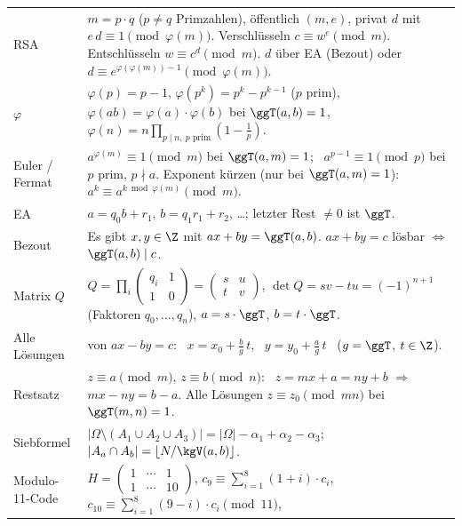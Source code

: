 \noindent\begin{tabular}{@{}>{\raggedright\arraybackslash}p{3.2cm}>{\raggedright\arraybackslash}p{\dimexpr\linewidth-3.2cm-2\tabcolsep\relax}@{}}
\toprule
RSA & $m = p \cdot q$ ($p \ne q$ Primzahlen), öffentlich $(m, e)$, privat $d$ mit $e\,d \equiv 1 \pmod{\varphi(m)}$.
Verschlüsseln $c \equiv w^e \pmod m$. Entschlüsseln $w \equiv c^d \pmod m$.
$d$ über EA (Bezout) oder $d \equiv e^{\varphi(\varphi(m)) - 1} \pmod{\varphi(m)}$.\\
$\varphi$ & $\varphi(p) = p - 1$, $\varphi(p^k) = p^k - p^{k-1}$ ($p$ prim), $\varphi(ab) = \varphi(a) \cdot \varphi(b)$ bei $\ggT(a,b) = 1$,
$\varphi(n) = n \prod_{p \mid n,\ p \text{ prim}} (1 - \frac1p)$.\\
Euler / Fermat & $a^{\varphi(m)} \equiv 1 \pmod m$ bei $\ggT(a, m) = 1$; \ $a^{p-1} \equiv 1 \pmod p$ bei $p$ prim, $p \nmid a$.
Exponent kürzen (nur bei $\ggT(a, m) = 1$): $a^k \equiv a^{k \bmod \varphi(m)} \pmod m$.\\
EA & $a = q_0 b + r_1$, $b = q_1 r_1 + r_2$, \dots; letzter Rest $\neq 0$ ist $\ggT$.\\
Bezout & Es gibt $x, y \in \Z$ mit $ax + by = \ggT(a,b)$. $ax + by = c$ lösbar $\Leftrightarrow$ $\ggT(a,b) \mid c$.\\
Matrix $Q$ & $Q = \prod_i \begin{pmatrix} q_i & 1\\ 1 & 0 \end{pmatrix} = \begin{pmatrix} s & u\\ t & v\end{pmatrix}$,
$\det Q = sv - tu = (-1)^{n+1}$ (Faktoren $q_0, \dots, q_n$), $a = s \cdot \ggT$, $b = t \cdot \ggT$.\\
Alle Lösungen & von $ax - by = c$: \ $x = x_0 + \frac{b}{g}\,t$, \ $y = y_0 + \frac{a}{g}\,t$ \ ($g = \ggT$, $t \in \Z$).\\
Restsatz & $z \equiv a \pmod m$, $z \equiv b \pmod n$: \ $z = mx + a = ny + b$ $\Rightarrow$ $mx - ny = b - a$.
Alle Lösungen $z \equiv z_0 \pmod{mn}$ bei $\ggT(m,n) = 1$.\\
Siebformel & $|\Omega \setminus (A_1 \cup A_2 \cup A_3)| = |\Omega| - \alpha_1 + \alpha_2 - \alpha_3$;
$|A_a \cap A_b| = \lfloor N / \kgV(a,b) \rfloor$.\\
Modulo-11-Code & $H = \begin{pmatrix} 1 & \cdots & 1\\ 1 & \cdots & 10\end{pmatrix}$,
$c_9 \equiv \sum_{i=1}^8 (1+i) \cdot c_i$, $c_{10} \equiv \sum_{i=1}^8 (9-i) \cdot c_i \pmod{11}$,

\end{tabular}
